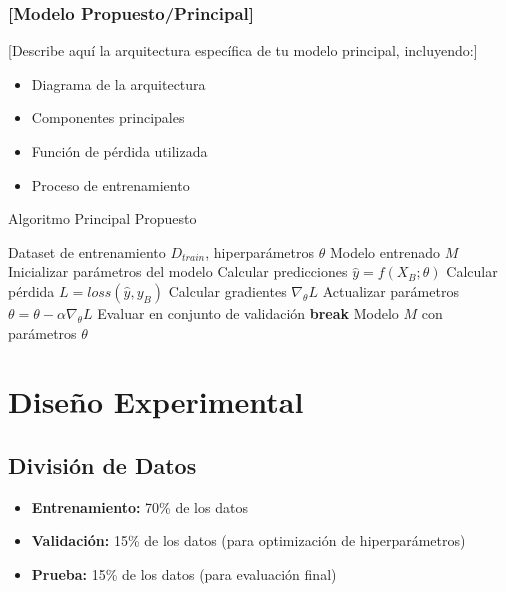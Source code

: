 \subsubsection{[Modelo Propuesto/Principal]}

[Describe aquí la arquitectura específica de tu modelo principal, incluyendo:]

\begin{itemize}
    \item Diagrama de la arquitectura
    \item Componentes principales
    \item Función de pérdida utilizada
    \item Proceso de entrenamiento
\end{itemize}

\begin{algorithm}[htbp]
\caption{Algoritmo Principal Propuesto}
\begin{algorithmic}[1]
\REQUIRE Dataset de entrenamiento $D_{train}$, hiperparámetros $\theta$
\ENSURE Modelo entrenado $M$
\STATE Inicializar parámetros del modelo
        \STATE Calcular predicciones $\hat{y} = f(X_B; \theta)$
        \STATE Calcular pérdida $L = loss(\hat{y}, y_B)$
        \STATE Calcular gradientes $\nabla_\theta L$
        \STATE Actualizar parámetros $\theta = \theta - \alpha \nabla_\theta L$
    \ENDFOR
    \STATE Evaluar en conjunto de validación
        \STATE \textbf{break}
    \ENDIF
\ENDFOR
\RETURN Modelo $M$ con parámetros $\theta$
\end{algorithmic}
\end{algorithm}

\section{Diseño Experimental}

\subsection{División de Datos}

\begin{itemize}
    \item \textbf{Entrenamiento:} 70\% de los datos
    \item \textbf{Validación:} 15\% de los datos (para optimización de hiperparámetros)
    \item \textbf{Prueba:} 15\% de los datos (para evaluación final)
\end{itemize}


